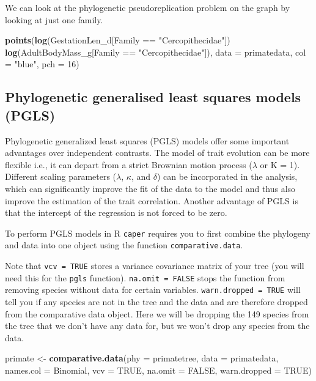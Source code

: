 \documentclass[12pt]{article}
\newcommand{\KeywordTok}[1]{\textcolor[rgb]{0.13,0.29,0.53}{\textbf{{#1}}}}
\newcommand{\DataTypeTok}[1]{\textcolor[rgb]{0.13,0.29,0.53}{{#1}}}
\newcommand{\DecValTok}[1]{\textcolor[rgb]{0.00,0.00,0.81}{{#1}}}
\newcommand{\StringTok}[1]{\textcolor[rgb]{0.31,0.60,0.02}{{#1}}}
\newcommand{\OtherTok}[1]{\textcolor[rgb]{0.56,0.35,0.01}{{#1}}}
\newcommand{\NormalTok}[1]{{#1}}
\begin{document}
We can look at the phylogenetic pseudoreplication problem on the graph by looking at just one family.

\begin{snugshade}
\begin{Highlighting}[]
\KeywordTok{points}\NormalTok{(}\KeywordTok{log}\NormalTok{(GestationLen_d[Family ==}\StringTok{ "Cercopithecidae"}\NormalTok{]) ~}
      \StringTok{ }\KeywordTok{log}\NormalTok{(AdultBodyMass_g[Family ==}\StringTok{ } \StringTok{"Cercopithecidae"}\NormalTok{]), }
       \DataTypeTok{data =} \NormalTok{primatedata, }\DataTypeTok{col =} \StringTok{"blue"}\NormalTok{, }\DataTypeTok{pch =} \DecValTok{16}\NormalTok{)}
\end{Highlighting}
\end{snugshade}

\newpage
\subsection{Phylogenetic generalised least squares models (PGLS)}
Phylogenetic generalized least squares (PGLS) models offer some important advantages over independent contrasts. The model of trait evolution can be more flexible i.e., it can depart from a strict Brownian motion process ($\lambda$ or K = 1). Different scaling parameters ($\lambda$, $\kappa$, and $\delta$) can be incorporated in the analysis, which can significantly improve the fit of the data to the model and thus also improve the estimation of the trait correlation. Another advantage of PGLS is that the intercept of the regression is not forced to be zero.

To perform PGLS models in R \texttt{caper} requires you to first combine the phylogeny and data into one object using the function \texttt{comparative.data}. 

Note that \texttt{vcv = TRUE} stores a variance covariance matrix of your tree (you will need this for the \texttt{pgls} function). \texttt{na.omit = FALSE} stops the function from removing species without data for certain variables. \texttt{warn.dropped = TRUE} will tell you if any species are not in the tree and the data and are therefore dropped from the comparative data object. Here we will be dropping the 149 species from the tree that we don't have any data for, but we won't drop any species from the data.

\begin{snugshade}
\begin{Highlighting}[]
\NormalTok{primate <-}\StringTok{ }\KeywordTok{comparative.data}\NormalTok{(}\DataTypeTok{phy =} \NormalTok{primatetree, }\DataTypeTok{data =} \NormalTok{primatedata, }
                            \DataTypeTok{names.col =} \NormalTok{Binomial, }\DataTypeTok{vcv =} \OtherTok{TRUE}\NormalTok{, }
                            \DataTypeTok{na.omit =} \OtherTok{FALSE}\NormalTok{, }\DataTypeTok{warn.dropped =} \OtherTok{TRUE}\NormalTok{)}
\end{Highlighting}
\end{snugshade}
\end{document}
